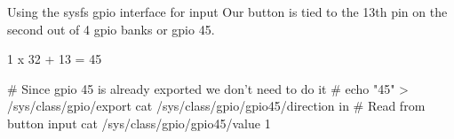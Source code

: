 \begin{frame}
   {Using the sysfs gpio interface for input}
Our button is tied to the 13th pin on the second out of 4 gpio banks or gpio 45.

1 x 32 + 13 = 45
   \begin{raw}
# Since gpio 45 is already exported we don't need to do it
# echo "45" > /sys/class/gpio/export
cat /sys/class/gpio/gpio45/direction
in
# Read from button input
cat /sys/class/gpio/gpio45/value
1
   \end{raw}
\end{frame}

\cprotect\note{


}

